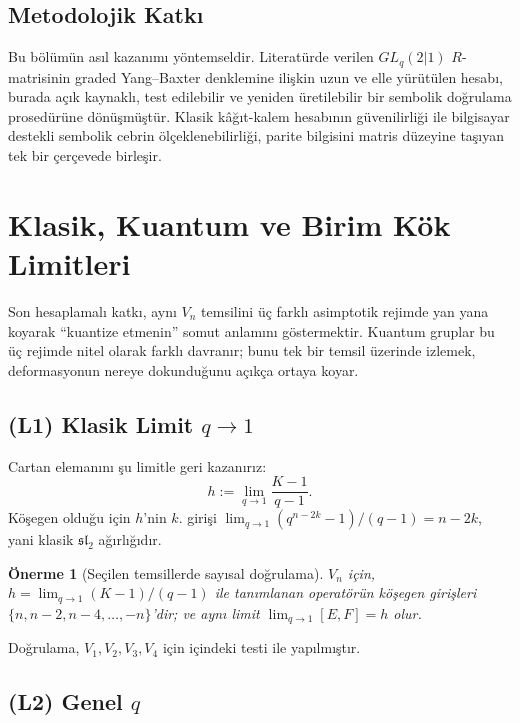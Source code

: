 \documentclass[10pt]{math}
\numberwithin{equation}{section}
\theoremstyle{plain}
\newtheorem{proposition}[theorem]{Önerme}
\theoremstyle{definition}
\renewcommand{\sl}{\mathfrak{sl}}
\begin{document}
\subsection{Metodolojik Katkı}

Bu bölümün asıl kazanımı yöntemseldir. Literatürde verilen $GL_q(2|1)$
$R$-matrisinin graded Yang--Baxter denklemine ilişkin uzun ve elle yürütülen
hesabı, burada açık kaynaklı, test edilebilir ve yeniden üretilebilir bir
sembolik doğrulama prosedürüne dönüşmüştür. Klasik kâğıt-kalem hesabının
güvenilirliği ile bilgisayar destekli sembolik cebrin ölçeklenebilirliği,
parite bilgisini matris düzeyine taşıyan tek bir çerçevede birleşir.

\section{Klasik, Kuantum ve Birim Kök Limitleri}\label{sec:limits}

Son hesaplamalı katkı, aynı $V_n$ temsilini üç farklı asimptotik rejimde yan
yana koyarak ``kuantize etmenin'' somut anlamını göstermektir. Kuantum gruplar
bu üç rejimde nitel olarak farklı davranır; bunu tek bir temsil üzerinde
izlemek, deformasyonun nereye dokunduğunu açıkça ortaya koyar.

\subsection{(L1) Klasik Limit $q \to 1$}

Cartan elemanını şu limitle geri kazanırız:
\[
  h := \lim_{q \to 1} \frac{K - 1}{q - 1}.
\]
Köşegen olduğu için $h$'nin $k$. girişi
$\lim_{q \to 1} (q^{n-2k} - 1)/(q - 1) = n - 2k$, yani klasik
$\sl_2$ ağırlığıdır.

\begin{proposition}[Seçilen temsillerde sayısal doğrulama]\label{thm:classical}
$V_n$ için, $h = \lim_{q\to 1} (K-1)/(q-1)$ ile tanımlanan operatörün
köşegen girişleri $\{n, n-2, n-4, \dots, -n\}$'dir; ve aynı limit
$\lim_{q\to 1} [E,F] = h$ olur.
\end{proposition}

Doğrulama, $V_1, V_2, V_3, V_4$ için 
içindeki  testi ile
yapılmıştır.

\subsection{(L2) Genel $q$}
\end{document}
